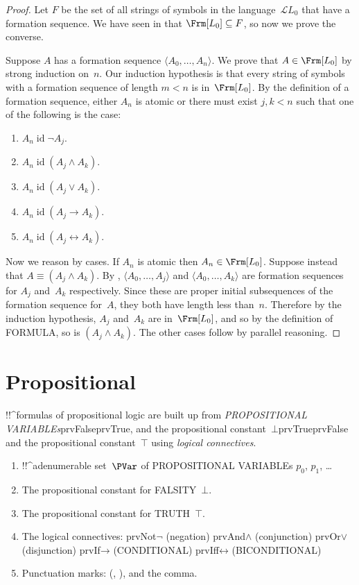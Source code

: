 \documentclass[10pt,a4paper]{article}
\makeatletter
\newcommand*{\olup}[1]{\MakeUppercase{#1}}
\theoremstyle{plain}
\theoremstyle{definition}
\theoremstyle{remark}
\newcommand*{\olfileid}[3]{}
\newcommand*{\olsection}[1]{\section*{#1}}
\newcommand{\olref}{\@ifnextchar[{\olref@i}{\olref@final}}
\def\olref@i[#1]{\@ifnextchar[{\olref@ii}{\olref@final}}
\def\olref@ii[#1]{\@ifnextchar[{\olref@iii}{\olref@final}}
\def\olref@iii[#1]{\olref@final}
\def\olref@final#1{\ref{#1}}
\providecommand{\lif}{\mathbin{\rightarrow}}
\providecommand{\ltrue}{\top}
\providecommand{\lfalse}{\bot}
\providecommand{\Obj}{}
\providecommand{\Lang}{\ensuremath{\mathcal{L}}}
\providecommand{\tuple}[1]{\langle #1 \rangle}
\providecommand{\iftag}[1]{#1}
\providecommand{\tagitem}[1]{\item[#1]}
\providecommand{\liff}{\mathbin{\leftrightarrow}}
\providecommand{\ident}{\operatorname{id}}
\providecommand{\iftag}{}
\makeatother
\begin{document}
\begin{proof}
Let $F$ be the set of all strings of symbols in the
language~$\Lang L_0$ that have a formation sequence.
We have seen in \olref[pl][syn][fseq]{prop:formed} that
$\Frm[L_0] \subseteq F$, so now we prove the converse.

Suppose $A$ has a formation sequence $\tuple{A_0,\dotsc,A_n}$.
We prove that $A \in \Frm[L_0]$ by strong induction on~$n$.
Our induction hypothesis is that every string of symbols with a
formation sequence of length $m < n$ is in~$\Frm[L_0]$.
By the definition of a formation sequence, either $A_n$ is
atomic or there must exist $j,k < n$ such that one of the
following is the case:
\begin{enumerate}
    \tagitem{prvNot}{$A_n \ident \lnot A_j$.}{}%
    \tagitem{prvAnd}{$A_n \ident (A_j \land A_k)$.}{}%
    \tagitem{prvOr}{$A_n \ident (A_j \lor A_k)$.}{}%
    \tagitem{prvIf}{$A_n \ident (A_j \lif A_k)$.}{}%
    \tagitem{prvIff}{$A_n \ident (A_j \liff A_k)$.}{}%
\end{enumerate}
Now we reason by cases. If $A_n$ is atomic then
$A_n \in \Frm[L_0]$. Suppose instead that $A \equiv
(A_j \land A_k)$. By \olref[pl][syn][fseq]{lem:fseq-init},
$\tuple{A_0,\dotsc,A_j}$ and $\tuple{A_0,\dotsc,A_k}$ are
formation sequences for $A_j$ and~$A_k$ respectively. Since
these are proper initial subsequences of the formation sequence
for~$A$, they both have length less than~$n$. Therefore by
the induction hypothesis, $A_j$ and~$A_k$ are in~$\Frm[L_0]$,
and so by the definition of \olup{formula}, so is
$(A_j \land A_k)$. The other cases follow by parallel
reasoning.
\end{proof}





\olfileid{pl}{syn}{fml}

\olsection{Propositional }

!!^{formula}s of propositional logic are built up from
\emph{\olup{propositional
    variable}s}\iftag{prvFalse}{\iftag{prvTrue}{,}{ and} the
  propositional constant~$\lfalse$}{}\iftag{prvTrue}{\iftag{prvFalse}{
    and}{} the propositional constant~$\ltrue$}{} using \emph{logical
  connectives}.

\begin{enumerate}
\item !!^a{denumerable} set~$\PVar$ of \olup{propositional variable}s $\Obj p_0$,
  $\Obj p_1$, \dots
\tagitem{prvFalse}{The propositional constant for \olup{falsity}~$\lfalse$.}{}
\tagitem{prvTrue}{The propositional constant for \olup{truth}~$\ltrue$.}{}
\item The logical connectives:
  \startycommalist
  \iftag{prvNot}{\ycomma $\lnot$ (negation)}{}%
  \iftag{prvAnd}{\ycomma $\land$ (conjunction)}{}%
  \iftag{prvOr}{\ycomma $\lor$ (disjunction)}{}%
  \iftag{prvIf}{\ycomma $\lif$ (\olup{conditional})}{}%
  \iftag{prvIff}{\ycomma $\liff$ (\olup{biconditional})}{}%
\item Punctuation marks: (, ), and the comma.
\end{enumerate}
\end{document}
